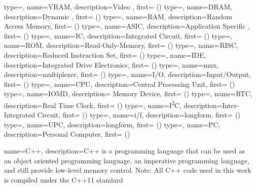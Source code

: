 {
    type=\acronymtype,
    name={VRAM},
    description={Video },
    first={ ()}
}
{
    type=\acronymtype,
    name={DRAM},
    description={Dynamic },
    first={ ()}
}
{
    type=\acronymtype,
    name={RAM},
    description={Random Access Memory},
    first={ ()}
}
{
  type=\acronymtype,
  name={ASIC},
  description={Application Specific },
  first={ ()}
}
{
  type=\acronymtype,
  name={IC},
  description={Integrated Circuit},
  first={ ()}
}
{
  type=\acronymtype,
  name={ROM},
  description={Read-Only-Memory},
  first={ ()}
}
{
  type=\acronymtype,
  name={RISC},
  description={Reduced Instruction Set},
  first={ ()}
}
{
  type=\acronymtype,
  name={IDE},
  description={Integrated Drive Electronics},
  first={ ()}
}
{
  type=\acronymtype,
  name={mux},
  description={multiplexer},
  first={ ()}
}
{
  type=\acronymtype,
  name={I/O},
  description={Input/Output},
  first={ ()}
}
{
  type=\acronymtype,
  name={CPU},
  description={Central Processing Unit},
  first={ ()}
}
{
  type=\acronymtype,
  name={IOMD},
  description={ Memory Device},
  first={ ()}
}
{
  type=\acronymtype,
  name={RTC},
  description={Real Time Clock},
  first={ ()}
}
{
  type=\acronymtype,
  name={I\textsuperscript{2}C},
  description={Inter-Integrated Circuit},
  first={ ()}
}
{
  type=\acronymtype,
  name={i/f},
  description={longform},
  first={ ()}
}
{
  type=\acronymtype,
  name={UPC},
  description={longform},
  first={ ()}
}
{
  type=\acronymtype,
  name={PC},
  description={Personal Computer},
  first={ ()}
}


{%
    name={C++},
    description={C++ is a programming language that can be used as an object oriented programming language, an imperative programming language, and still provide low-level memory control. Note: All C++ code used in this work is compiled under the C++11 standard}
}
